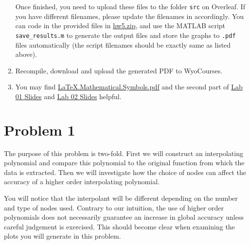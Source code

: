 \begin{enumerate}[label={\arabic*.}]
    Once finished, you need to upload these files to the folder \verb|src| on Overleaf. If you have different filenames, please update the filenames in \verb|| accordingly. You can code in the provided files in \href{https://libaoj.in/courses/2020f/MATH3340/Homework/5/hw5.zip}{hw5.zip}, and use the MATLAB script \verb|save_results.m| to generate the output files and store the graphs to \verb|.pdf| files automatically (the script filenames should be exactly same as listed above).
  \item Recompile, download and upload the generated PDF to WyoCourses.
  \item You may find \href{https://libaoj.in/files/LaTeX.Mathematical.Symbols.pdf}{\LaTeX{}.Mathematical.Symbols.pdf} and the second part of \href{https://libaoj.in/courses/2020f/MATH3341/slides/Math.3341.Lab.01.Slides.pdf}{Lab 01 Slides} and \href{https://libaoj.in/courses/2020f/MATH3341/slides/Math.3341.Lab.02.Slides.pdf}{Lab 02 Slides} helpful.
\end{enumerate}
\newpage

\section{Problem 1}%
\label{sec:problem_1}
The purpose of this problem is two-fold. First we will construct an interpolating polynomial and compare this polynomial to the original function from which the data is extracted. Then we will investigate how the choice of nodes can affect the accuracy of a higher order interpolating polynomial.

You will notice that the interpolant will be  different depending on the number and type of nodes used. Contrary to our intuition, the use of higher order polynomials does not necessarily guarantee an increase in global accuracy unless careful judgement is exercised. This should become clear when examining the plots you will generate in this problem.

